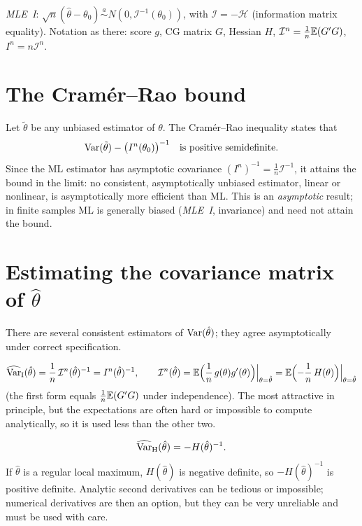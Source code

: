 \documentclass[11pt]{article}
\begin{document}

 \emph{MLE~I}: $\sqrt n(\hat\theta-\theta_{0})\overset{a}{\sim}N(0,\mathcal I^{-1}(\theta_{0}))$, with
$\mathcal I=-\mathcal H$ (information matrix equality). Notation as there: score $g$, CG matrix $G$,
Hessian $H$, $\mathcal I^{n}=\frac1n\mathbb{E}(G'G)$, $I^{n}=n\mathcal I^{n}$.

\section{The Cram\'er--Rao bound}

Let $\tilde\theta$ be any unbiased estimator of $\theta$. The Cram\'er--Rao inequality states that
\[ \operatorname{Var}(\tilde\theta)-\bigl(I^{n}(\theta_{0})\bigr)^{-1}\quad\text{is positive semidefinite.} \]
Since the ML estimator has asymptotic covariance $(I^{n})^{-1}=\frac1n\mathcal I^{-1}$, it attains the
bound in the limit: no consistent, asymptotically unbiased estimator, linear or nonlinear,
is asymptotically more efficient than ML. This is an \emph{asymptotic} result; in finite
samples ML is generally biased (\emph{MLE~I}, invariance) and need not attain the bound.

\section{Estimating the covariance matrix of $\hat\theta$}

There are several consistent estimators of $\operatorname{Var}(\hat\theta)$; they agree asymptotically
under correct specification.

\[ \widehat{\operatorname{Var}}_{\mathrm{I}}(\hat\theta)=\frac1n\,\mathcal I^{n}(\hat\theta)^{-1}=I^{n}(\hat\theta)^{-1},
   \qquad
   \mathcal I^{n}(\hat\theta)=\mathbb{E}\Bigl(\frac1n\,g(\theta)g'(\theta)\Bigr)\Big|_{\theta=\hat\theta}
   =\mathbb{E}\Bigl(-\frac1n\,H(\theta)\Bigr)\Big|_{\theta=\hat\theta} \]
(the first form equals $\frac1n\mathbb{E}(G'G)$ under independence). The most attractive in principle,
but the expectations are often hard or impossible to compute analytically, so it is used
less than the other two.

\[ \widehat{\operatorname{Var}}_{\mathrm{H}}(\hat\theta)=-H(\hat\theta)^{-1}. \]
If $\hat\theta$ is a regular local maximum, $H(\hat\theta)$ is negative definite, so $-H(\hat\theta)^{-1}$ is
positive definite. Analytic second derivatives can be tedious or impossible; numerical
derivatives are then an option, but they can be very unreliable and must be used with care.
\end{document}
